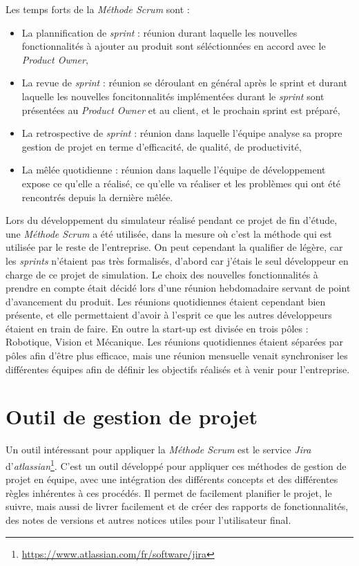 		Les temps forts de la \textit{Méthode Scrum} sont :

		\begin{itemize}
			\item La plannification de \textit{sprint} : réunion durant laquelle les nouvelles fonctionnalités à ajouter au produit sont séléctionnées en accord avec le \textit{Product Owner},
			\item La revue de \textit{sprint} : réunion se déroulant en général après le sprint et durant laquelle les nouvelles foncitonnalités implémentées durant le \textit{sprint} sont présentées au \textit{Product Owner} et au client, et le prochain sprint est préparé,
			\item La retrospective de \textit{sprint} : réunion dans laquelle l'équipe analyse sa propre gestion de projet en terme d'efficacité, de qualité, de productivité,
			\item La mêlée quotidienne : réunion dans laquelle l'équipe de développement expose ce qu'elle a réalisé, ce qu'elle va réaliser et les problèmes qui ont été rencontrés depuis la dernière mêlée.
		\end{itemize}
	
		Lors du développement du simulateur réalisé pendant ce projet de fin d'étude, une \textit{Méthode Scrum} a été utilisée, dans la mesure où c'est la méthode qui est utilisée par le reste de l'entreprise. On peut cependant la qualifier de légère, car les \textit{sprints} n'étaient pas très formalisés, d'abord car j'étais le seul développeur en charge de ce projet de simulation. Le choix des nouvelles fonctionnalités à prendre en compte était décidé lors d'une réunion hebdomadaire servant de point d'avancement du produit. Les réunions quotidiennes étaient cependant bien présente, et elle permettaient d'avoir à l'esprit ce que les autres développeurs étaient en train de faire. En outre la start-up est divisée en trois pôles : Robotique, Vision et Mécanique. Les réunions quotidiennes étaient séparées par pôles afin d'être plus efficace, mais une réunion mensuelle venait synchroniser les différentes équipes afin de définir les objectifs réalisés et à venir pour l'entreprise.

	\section{Outil de gestion de projet}

		Un outil intéressant pour appliquer la \textit{Méthode Scrum} est le service \textit{Jira} d'\textit{atlassian}\footnote{\url{https://www.atlassian.com/fr/software/jira}}. C'est un outil développé pour appliquer ces méthodes de gestion de projet en équipe, avec une intégration des différents concepts et des différentes règles inhérentes à ces procédés. Il permet de facilement planifier le projet, le suivre, mais aussi de livrer facilement et de créer des rapports de fonctionnalités, des notes de versions et autres notices utiles pour l'utilisateur final.

